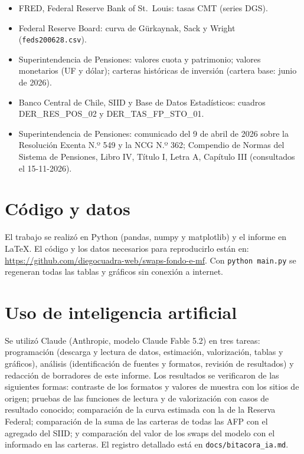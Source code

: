 \documentclass[11pt,letterpaper]{article}
\begin{document}
\begin{itemize}[leftmargin=*]
\item FRED, Federal Reserve Bank of St.\ Louis: tasas CMT (series DGS).
\item Federal Reserve Board: curva de Gürkaynak, Sack y Wright (\texttt{feds200628.csv}).
\item Superintendencia de Pensiones: valores cuota y patrimonio; valores monetarios (UF
y dólar); carteras históricas de inversión (cartera base: junio de 2026).
\item Banco Central de Chile, SIID y Base de Datos Estadísticos: cuadros
DER\_RES\_POS\_02 y DER\_TAS\_FP\_STO\_01.
\item Superintendencia de Pensiones: comunicado del 9 de abril de 2026 sobre la
Resolución Exenta N.º 549 y la NCG N.º 362; Compendio de Normas del Sistema de
Pensiones, Libro IV, Título I, Letra A, Capítulo III (consultados el 15-11-2026).
\end{itemize}

\section{Código y datos}

El trabajo se realizó en Python (pandas, numpy y matplotlib) y el informe en LaTeX. El
código y los datos necesarios para reproducirlo están en: \url{https://github.com/diegocuadra-web/swaps-fondo-e-mf}. Con \texttt{python main.py} se regeneran
todas las tablas y gráficos sin conexión a internet.

\section{Uso de inteligencia artificial}

Se utilizó Claude (Anthropic, modelo Claude Fable 5.2) en tres tareas: programación (descarga y lectura de datos, estimación,
valorización, tablas y gráficos), análisis (identificación de fuentes y formatos,
revisión de resultados) y redacción de borradores de este informe. Los resultados se
verificaron de las siguientes formas: contraste de los formatos y valores de muestra
con los sitios de origen; pruebas de las funciones de lectura y de valorización con
casos de resultado conocido; comparación de la curva estimada con la de la Reserva
Federal; comparación de la suma de las carteras de todas las AFP con el agregado del
SIID; y comparación del valor de los swaps del modelo con el informado en las carteras.
El registro detallado está en \texttt{docs/bitacora\_ia.md}.
\end{document}
